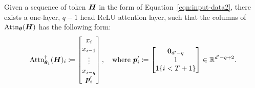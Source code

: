 \begin{lemma}
    Given a sequence of token $\boldsymbol{H}$ in the form of Equation~\ref{eqn:input-data2}, there exists a one-layer, $q-1$ head ReLU attention layer, such that the columns of $\text{Attn}_{\bm{\theta}}( \boldsymbol{H} )$ has the following form:
    \begin{equation}
    \text{Attn}_{\bm{\theta}_1}^{\dagger}( \boldsymbol{H} )_i
    \coloneqq
        \begin{bmatrix}
            x_i
            \\
            x_{i-1}
            \\
            \vdots
            \\
            x_{i-q}
            \\
            \bm{p}_i^\prime
        \end{bmatrix},
        \quad
        \text{where }
        \bm{p}_i^\prime 
        \coloneqq
        \begin{bmatrix}
        \mathbf{0}_{ d^\prime - q }
        \\
        1
        \\
        1 \{ i < T + 1 \}
        \end{bmatrix}
        \in \mathbb{R}^{ d^\prime - q + 2 }.
    \end{equation}
\end{lemma}





